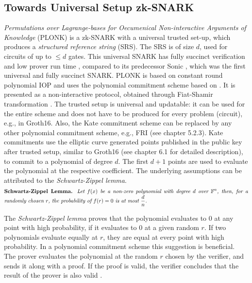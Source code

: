 \subsection{Towards Universal Setup zk-SNARK}
\textit{Permutations over Lagrange-bases for Oecumenical Non-interactive Arguments of Knowledge} (PLONK) is a zk-SNARK with a universal trusted set-up, which produces a \textit{structured reference string} (SRS). The SRS is of size \(d\), used for circuits of up to \(\leq d\) gates. This universal SNARK has fully succinct verification and low prover run time \citep{PLONKcryptoeprint:2019/953}, compared to its predecessor Sonic \citep{SONIC10.1145/3319535.3339817}, which was the first universal and fully succinct SNARK. PLONK is based on constant round polynomial IOP and uses the polynomial commitment scheme based on \citet{Kate2010ConstantSizeCT}. It is presented as a non-interactive protocol, obtained through Fiat-Shamir transformation \citep{PLONKcryptoeprint:2019/953}. The trusted setup is universal and updatable: it can be used for the entire scheme and does not have to be produced for every problem (circuit), e.g., in Groth16. Also, the Kate commitment scheme can be replaced by any other polynomial commitment scheme, e.g., FRI (see chapter 5.2.3). 
Kate commitments use the elliptic curve generated points published in the public key after trusted setup, similar to Groth16 (see chapter 6.1 for detailed description), to commit to a polynomial of degree \(d\). The first \(d+1\) points are used to evaluate the polynomial at the respective coefficient. The underlying assumptions can be attributed to the \textit{Schwartz-Zippel lemma}.
\begin{align*}
    \text{\parbox{450pt}{\textbf{Schwartz-Zippel Lemma.} \textit{Let \(f(x)\) be a non-zero polynomial with degree \(d\) over \begin{math}\mathbb{F}^n\end{math}, then, for a randomly chosen \(r\), the probability of \(f(r) = 0\) is at most \(\frac{d}{n}\).}}}
\end{align*}
    
The \textit{Schwartz-Zippel lemma} proves that the polynomial evaluates to 0 at any point with high probability, if it evaluates to 0 at a given random \(r\). If two polynomials evaluate equally at \(r\), they are equal at every point with high probability. In a polynomial commitment scheme this suggestion is beneficial. The prover evaluates the polynomial at the random \(r\) chosen by the verifier, and sends it along with a proof. If the proof is valid, the verifier concludes that the result of the prover is also valid \citep{Kate2010ConstantSizeCT}.

